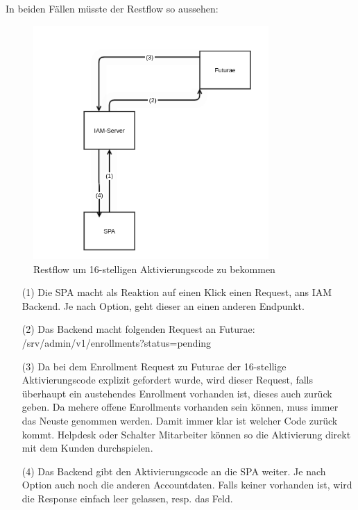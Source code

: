 In beiden Fällen müsste der Restflow so aussehen:
\begin{figure}[H]
	\begin{center}
		\includegraphics[width=0.8\textwidth]{ressourcen/restflow}
		\caption[Restflow]{Restflow um 16-stelligen Aktivierungscode zu bekommen}\label{fig:restflow}
	\end{center}
\end{figure}

\begin{itemize}
	\item[(1)] Die SPA macht als Reaktion auf einen Klick einen Request, ans IAM Backend. Je nach Option, geht dieser an einen anderen Endpunkt. 
	\item[(2)] Das Backend macht folgenden Request an Futurae: \newline
	/srv/admin/v1/enrollments?status=pending
	\item[(3)] 	Da bei dem Enrollment Request zu Futurae der 16-stellige Aktivierungscode explizit gefordert wurde, wird dieser Request, falls überhaupt ein austehendes Enrollment vorhanden ist, dieses auch zurück geben. Da mehere offene Enrollments vorhanden sein können, muss immer das Neuste genommen werden. Damit immer klar ist welcher Code zurück kommt. Helpdesk oder Schalter Mitarbeiter können so die Aktivierung direkt mit dem Kunden durchspielen.
	\item[(4)] Das Backend gibt den Aktivierungscode an die SPA weiter. Je nach Option auch noch die anderen Accountdaten. Falls keiner vorhanden ist, wird die Response einfach leer gelassen, resp. das Feld.
\end{itemize}


